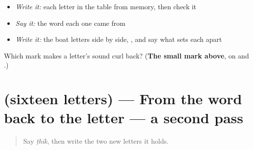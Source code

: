\begin{itemize}
\raggedright
  \item \emph{Write it:} each letter in the table from memory, then check it
  \item \emph{Say it:} the word each one came from
  \item \emph{Write it:} the boat letters side by side,    , and say what sets each apart
\end{itemize}

\begin{tcolorbox}[breakable,colback=teal!4,colframe=teal!35!black,title={Before you move on}]
Which mark makes a letter's sound curl back? (\textbf{The small mark above}, on \textbf{} and \textbf{}.)
\end{tcolorbox}
\section[(sixteen letters)]{(sixteen letters) — From the word back to the letter — a second pass}

\label{lesson:UR-R37-letters-second-pass}



\begin{quote}
Say \emph{ṭhīk}, then write the two new letters it holds.
\end{quote}

